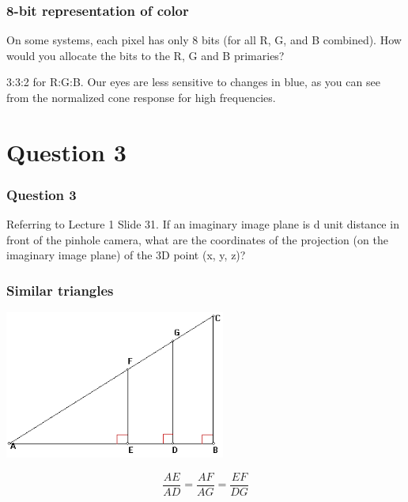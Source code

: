 \documentclass{beamer}
\begin{document}
\begin{frame}
    \frametitle{8-bit representation of color}
    On some systems, each pixel has only 8 bits (for all R, G, and B combined). 
    How would you allocate the bits to the R, G and B primaries?

    \begin{tcolorbox}
        3:3:2 for R:G:B. Our eyes are less sensitive to changes in blue, 
        as you can see from the normalized cone response for high frequencies.
    \end{tcolorbox}

\end{frame}

\section{Question 3}

\begin{frame}
    \frametitle{Question 3}
    Referring to Lecture 1 Slide 31. If an imaginary image plane is d unit distance in front of the
    pinhole camera, what are the coordinates of the projection (on the imaginary image plane) of
    the 3D point (x, y, z)?
\end{frame}

\begin{frame}
    \frametitle{Similar triangles}

    \begin{center}
        \includegraphics[scale=0.8]{similar-tris.png}
    \end{center}

    $$
    \frac{AE}{AD} = \frac{AF}{AG} = \frac{EF}{DG}
    $$

\end{frame}
\end{document}
